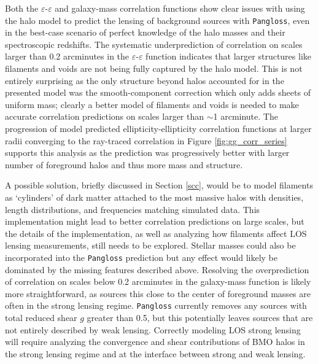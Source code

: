 \documentclass[%
 reprint,
 amsmath,amssymb,
 aps,nofootinbib
]{revtex4-1}
\begin{document}
Both the $\varepsilon$-$\varepsilon$ and galaxy-mass correlation functions show clear issues with using the halo model to predict the lensing of background sources with \texttt{Pangloss}, even in the best-case scenario of perfect knowledge of the halo masses and their spectroscopic redshifts. The systematic underprediction of correlation on scales larger than 0.2 arcminutes in the $\varepsilon$-$\varepsilon$ function indicates that larger structures like filaments and voids are not being fully captured by the halo model. This is not entirely surprising as the only structure beyond halos accounted for in the presented model was the smooth-component correction which only adds sheets of uniform mass; clearly a better model of filaments and voids is needed to make accurate correlation predictions on scales larger than $\sim$1 arcminute. The progression of model predicted ellipticity-ellipticity correlation functions at larger radii converging to the ray-traced correlation in Figure \ref{fig:gg_corr_series} supports this analysis as the prediction was progressively better with larger number of foreground halos and thus more mass and structure.

A possible solution, briefly discussed in Section \ref{scc}, would be to model filaments as `cylinders' of dark matter attached to the most massive halos with densities, length distributions, and frequencies matching simulated data. This implementation might lead to better correlation predictions on large scales, but the details of the implementation, as well as analyzing how filaments affect LOS lensing measurements, still needs to be explored. Stellar masses could also be incorporated into the \texttt{Pangloss} prediction but any effect would likely be dominated by the missing features described above. Resolving the overprediction of correlation on scales below 0.2 arcminutes in the galaxy-mass function is likely more straightforward, as sources this close to the center of foreground masses are often in the strong lensing regime. \texttt{Pangloss} currently removes any sources with total reduced shear $g$ greater than 0.5, but this potentially leaves sources that are not entirely described by weak lensing. Correctly modeling LOS strong lensing will require analyzing the convergence and shear contributions of BMO halos in the strong lensing regime and at the interface between strong and weak lensing.

\end{document}
